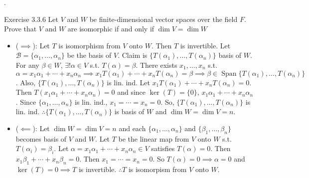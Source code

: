 \documentclass[8pt]{beamer}
\newcommand{\mc}[1]{\mathcal{#1}}
\newcommand{\Span}{\operatorname{Span}}
\begin{document}
\begin{frame}{.}
    \begin{block}{Exercise 3.3.6}
        Let $V$ and $W$ be finite-dimensional vector spaces over the field $F$. Prove that $V$ and $W$ are isomorphic if and only if $\dim V = \dim W$
    \end{block}
    \begin{itemize}
        \item ($\implies$): Let $T$ is isomorphism from $V$ onto $W$.
        Then $T$ is invertible.
        Let $\mc{B} = \{\alpha_1, \dots, \alpha_n\}$ be the basis of $V$.
        Claim is $\{T(\alpha_1), \dots, T(\alpha_n)\}$ basis of $W$.
        For any $\beta \in W$, $\exists! \alpha \in V$ s.t. $T(\alpha) = \beta$.
        There exists $x_1, \dots, x_n$ s.t. $\alpha = x_1 \alpha_1 + \cdots + x_n \alpha_n \implies x_1 T(\alpha_1) + \cdots + x_n T(\alpha_n) = \beta \implies \beta \in \Span \{T(\alpha_1) ,\dots, T(\alpha_n)\}$.
        Also, $\{T(\alpha_1), \dots, T(\alpha_n)\}$ is lin. ind. Let $x_1 T(\alpha_1) + \cdots + x_n T(\alpha_n) = 0$. Then $T(x_1 \alpha_1 + \cdots + x_n \alpha_n) = 0 $ and since $\ker (T) = \{0\}$, $x_1 \alpha_1 + \cdots + x_n \alpha_n$.
        Since $\{\alpha_1, \dots, \alpha_n\}$ is lin. ind., $x_1 = \cdots = x_n = 0$.
        So, $\{T(\alpha_1), \dots, T(\alpha_n)\}$ is lin. ind.
        $\therefore \{T(\alpha_1), \dots, T(\alpha_n)\}$ is basis of $W$ and $\dim W = \dim V = n$.
        \item ($\impliedby$): Let $\dim W = \dim V = n$ and each $\{\alpha_1, \dots, \alpha_n\}$ and $\{\beta_1, \dots, \beta_n\}$ becomes basis of $V$ and $W$. Let $T$ be the linear map from $V$ onto $W$ s.t. $T(\alpha_i) = \beta_i$. Let $\alpha = x_1 \alpha_1 + \cdots + x_n \alpha_n \in V$ satisfies $T(\alpha) = 0$.
        Then $x_1 \beta_1 + \cdots + x_n \beta_n = 0$. Then $x_1 = \cdots = x_n =0 $. So $T(\alpha) = 0 \implies \alpha = 0$ and $\ker (T) = 0 \implies T$ is invertible.
        $\therefore T$ is isomorpism from $V$ onto $W$.
    \end{itemize}
\end{frame}
\end{document}
